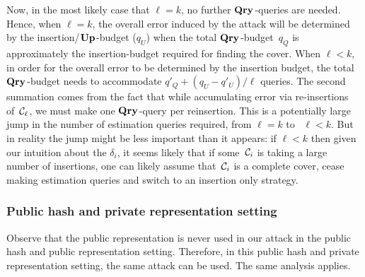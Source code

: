 Now, in the most likely case that $\ell=k$, no further $\textup{\textbf{Qry}}\hspace{0.5pt}$-queries are needed. Hence, when $\ell=k$, the overall error induced by the attack will be determined by the insertion/$\textup{\textbf{Up}}\hspace{0.5pt}$-budget ($q_U$) when the total $\textup{\textbf{Qry}}\hspace{0.5pt}$-budget~$q_Q$ is approximately the insertion-budget required for finding the cover.   When $\ell < k$, in order for the overall error to be determined by the insertion budget, the total $\textup{\textbf{Qry}}\hspace{0.5pt}$-budget needs to accommodate $q'_Q + (q_U - q'_U)/\ell$ queries. The second summation comes from the fact that while accumulating error via re-insertions of~$\mathcal{C}_\ell$, we must make one $\textup{\textbf{Qry}}\hspace{0.5pt}$-query per reinsertion.  
%
This is a potentially large jump in the number of estimation queries required, from $\ell=k$ to \ $\ell<k$.  But in reality the jump might be less important than it appears: if $\ell < k$ then given our intuition about the $\delta_i$, it seems likely that if some~$\mathcal{C}_i$ is taking a large number of insertions, one can likely assume that~$\mathcal{C}_i$ is a complete cover, cease making estimation queries and switch to an insertion only strategy.


 \subsubsection{Public hash and private representation setting}
Observe that the public representation is never used in our attack in the public hash and public representation setting. Therefore, in this public hash and private representation setting, the same attack can be used. The same analysis applies.

